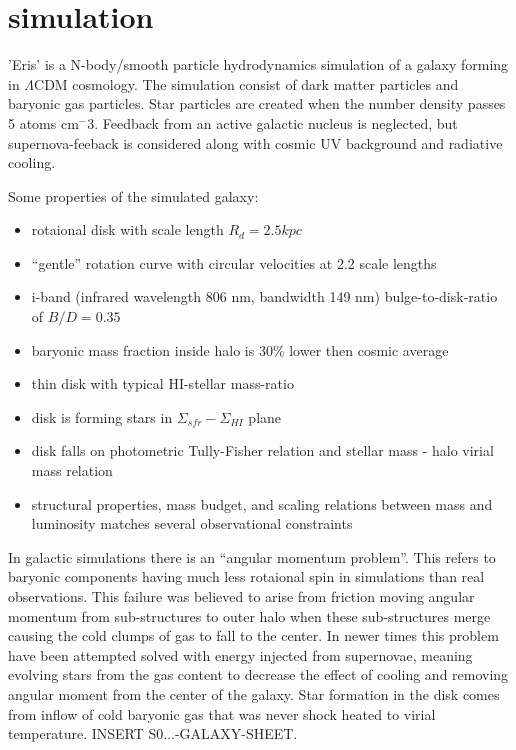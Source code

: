 

\section{\eris simulation}

'Eris' is a N-body/smooth particle hydrodynamics simulation of a
galaxy forming in $\Lambda$CDM cosmology.
The simulation consist of dark matter particles and baryonic gas
particles. Star particles are created when the number density
passes 5 atoms cm$^-3$. Feedback from an active galactic nucleus
is neglected, but supernova-feeback is considered along with
cosmic UV background and radiative cooling.

Some properties of the simulated galaxy:
\begin{itemize}
\item{rotaional disk with scale length $R_d=2.5kpc$}
\item{``gentle'' rotation curve with circular velocities at 2.2
  scale lengths}
\item{i-band (infrared wavelength 806 nm, bandwidth 149 nm)
  bulge-to-disk-ratio of $B/D=0.35$}
\item{baryonic mass fraction inside halo is 30\% lower then
  cosmic average}
\item{thin disk with typical HI-stellar mass-ratio}
\item{disk is forming stars in $\Sigma_{sfr}-\Sigma_{HI}$ plane}
\item{disk falls on photometric Tully-Fisher relation and
  stellar mass - halo virial mass relation}
\item{structural properties, mass budget, and scaling relations between mass and luminosity matches several observational constraints}
\end{itemize}

In galactic simulations there is an ``angular momentum problem''. This refers to baryonic components having much less rotaional spin in simulations than real observations. This failure was believed to arise from friction moving angular momentum from sub-structures to outer halo when these sub-structures merge causing the cold clumps of gas to fall to the center.
In newer times this problem have been attempted solved with energy injected from supernovae, meaning evolving stars from the gas content to decrease the effect of cooling and removing angular moment from the center of the galaxy.
Star formation in the disk comes from inflow of cold baryonic gas that was never shock heated to virial temperature.
INSERT S0...-GALAXY-SHEET.

